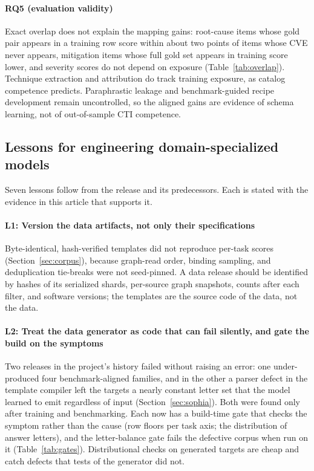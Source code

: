 \documentclass[twocolumn]{svjour3}
\begin{document}
\paragraph{RQ5 (evaluation validity)}
Exact overlap does not explain the mapping gains: root-cause items whose gold pair appears in a training row score within about two points of items whose CVE never appears, mitigation items whose full gold set appears in training score lower, and severity scores do not depend on exposure (Table~\ref{tab:overlap}). Technique extraction and attribution do track training exposure, as catalog competence predicts. Paraphrastic leakage and benchmark-guided recipe development remain uncontrolled, so the aligned gains are evidence of schema learning, not of out-of-sample CTI competence.

\subsection{Lessons for engineering domain-specialized models}\label{sec:lessons}
Seven lessons follow from the release and its predecessors. Each is stated with the evidence in this article that supports it.

\paragraph{L1: Version the data artifacts, not only their specifications}
Byte-identical, hash-verified templates did not reproduce per-task scores (Section~\ref{sec:corpus}), because graph-read order, binding sampling, and deduplication tie-breaks were not seed-pinned. A data release should be identified by hashes of its serialized shards, per-source graph snapshots, counts after each filter, and software versions; the templates are the source code of the data, not the data.

\paragraph{L2: Treat the data generator as code that can fail silently, and gate the build on the symptoms}
Two releases in the project's history failed without raising an error: one under-produced four benchmark-aligned families, and in the other a parser defect in the template compiler left the targets a nearly constant letter set that the model learned to emit regardless of input (Section~\ref{sec:sophia}). Both were found only after training and benchmarking. Each now has a build-time gate that checks the symptom rather than the cause (row floors per task axis; the distribution of answer letters), and the letter-balance gate fails the defective corpus when run on it (Table~\ref{tab:gates}). Distributional checks on generated targets are cheap and catch defects that tests of the generator did not.
\end{document}
